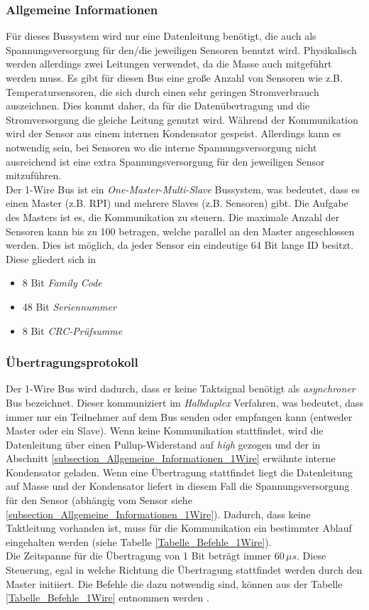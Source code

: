 \subsubsection*{Allgemeine Informationen}
\label{subsection_Allgemeine_Informationen_1Wire}
 Für dieses Bussystem wird nur eine Datenleitung benötigt, die auch als Spannungsversorgung für den\;/\;die jeweiligen Sensoren benutzt wird. Physikalisch werden allerdings zwei Leitungen verwendet, da die Masse auch mitgeführt werden muss. Es gibt für diesen Bus eine große Anzahl von Sensoren wie z.B. Temperatursensoren, die sich durch einen sehr geringen Stromverbrauch auszeichnen. Dies kommt daher, da für die Datenübertragung und die Stromversorgung die gleiche Leitung genutzt wird. Während der Kommunikation wird der Sensor aus einem internen Kondensator gespeist. Allerdings kann es notwendig sein, bei Sensoren wo die interne Spannungsversorgung nicht ausreichend ist  eine extra Spannungsversorgung für den jeweiligen Sensor mitzuführen. \\
Der 1-Wire Bus ist ein \textit{One-Master-Multi-Slave} Bussystem, was bedeutet, dass es  einen Master (z.B. \ac{RPI}) und mehrere Slaves (z.B. Sensoren) gibt. Die Aufgabe des Masters  ist es, die Kommunikation zu steuern. Die maximale Anzahl der Sensoren kann bis zu 100 betragen, welche parallel an den Master angeschlossen werden. Dies ist möglich, da jeder Sensor ein eindeutige 64 Bit lange ID besitzt. Diese gliedert sich in \citep{Bussysteme_in_der_Praxis}
\begin{itemize}
\item 8 Bit \textit{Family Code}
\item 48 Bit \textit{Seriennummer}
\item 8 Bit \textit{CRC-Prüfsumme}
\end{itemize}

\subsubsection*{Übertragungsprotokoll}
\label{subsection_Protokoll_1Wire}
Der 1-Wire Bus wird dadurch, dass er keine Taktsignal benötigt als \textit{asynchroner} Bus bezeichnet. Dieser kommuniziert im \textit{Halbduplex} Verfahren, was bedeutet, dass immer nur ein Teilnehmer auf dem Bus senden oder empfangen kann (entweder Master oder ein Slave). Wenn keine Kommunikation stattfindet, wird die Datenleitung über einen Pullup-Widerstand auf \textit{high} gezogen und der in Abschnitt \ref{subsection_Allgemeine_Informationen_1Wire} erwähnte interne Kondensator geladen. Wenn eine Übertragung stattfindet liegt die Datenleitung auf Masse und der Kondensator liefert in diesem Fall die Spannungsversorgung für den Sensor (abhängig vom Sensor siehe \ref{subsection_Allgemeine_Informationen_1Wire}). Dadurch, dass keine Taktleitung vorhanden ist, muss für die Kommunikation ein bestimmter Ablauf eingehalten werden (siehe Tabelle \ref{Tabelle_Befehle_1Wire}).\\
Die Zeitspanne für die Übertragung von 1 Bit beträgt immer 60\,$\mu s$. Diese Steuerung, egal in welche Richtung die Übertragung stattfindet werden durch den Master initiiert. Die Befehle die dazu notwendig sind, können aus der Tabelle \ref{Tabelle_Befehle_1Wire} entnommen werden \citep{Bussysteme_in_der_Praxis}.

